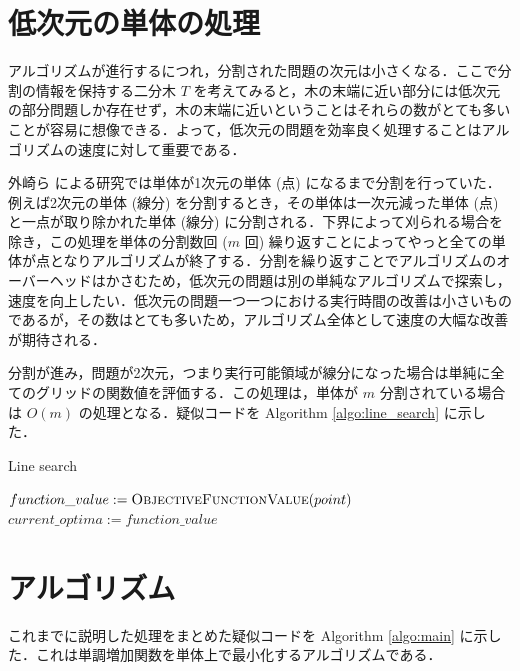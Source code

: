 \documentclass[a4paper,11pt]{jreport}
\begin{document}
\section{低次元の単体の処理}

アルゴリズムが進行するにつれ，分割された問題の次元は小さくなる．ここで分割の情報を保持する二分木 $ T $ を考えてみると，木の末端に近い部分には低次元の部分問題しか存在せず，木の末端に近いということはそれらの数がとても多いことが容易に想像できる．よって，低次元の問題を効率良く処理することはアルゴリズムの速度に対して重要である．\par
外崎ら \cite{tonosaki} による研究では単体が1次元の単体 (点) になるまで分割を行っていた．例えば2次元の単体 (線分) を分割するとき，その単体は一次元減った単体 (点) と一点が取り除かれた単体 (線分) に分割される．下界によって刈られる場合を除き，この処理を単体の分割数回 ($ m $ 回) 繰り返すことによってやっと全ての単体が点となりアルゴリズムが終了する．分割を繰り返すことでアルゴリズムのオーバーヘッドはかさむため，低次元の問題は別の単純なアルゴリズムで探索し，速度を向上したい．低次元の問題一つ一つにおける実行時間の改善は小さいものであるが，その数はとても多いため，アルゴリズム全体として速度の大幅な改善が期待される．\par
分割が進み，問題が2次元，つまり実行可能領域が線分になった場合は単純に全てのグリッドの関数値を評価する．この処理は，単体が $ m $ 分割されている場合は $ O(m) $ の処理となる．疑似コードを Algorithm \ref{algo:line_search} に示した．\par

\begin{algorithm}
\caption{Line search}
\label{algo:line_search}
\begin{algorithmic}[1]
\State $ function\_value := \Call{ObjectiveFunctionValue}{point} $
\State $current\_optima := function\_value $
\EndIf
\EndFor
\EndFunction
\end{algorithmic}
\end{algorithm}

\section{アルゴリズム}

これまでに説明した処理をまとめた疑似コードを Algorithm \ref{algo:main} に示した．これは単調増加関数を単体上で最小化するアルゴリズムである．\par
\end{document}
